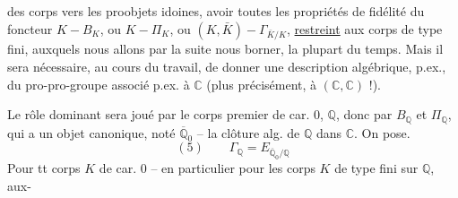 des corps vers les proobjets idoines,  avoir toutes les propriétés de fidélité du foncteur $K-B_K$, ou $K-\Pi_K$, ou $(K,\bar K)-\Gamma_{\bar K/K}$, \uline{restreint} aux corps  de type fini, auxquels nous allons par la suite nous borner, la plupart du temps. Mais il sera nécessaire, au cours du travail, de donner une description  algébrique, p.ex., du pro-pro-groupe  associé p.ex. à $\mathbb C$ (plus précisément, à $(\mathbb C,\mathbb C)$ !).

Le rôle dominant sera joué par le corps premier de car. $0$, $\mathbb Q$, donc par $B_{\mathbb Q}$ et $\Pi_{\mathbb Q}$, qui a un objet canonique, noté $\overline{\mathbb Q}_0$ -- la clôture alg. de $\mathbb Q$ dans $\mathbb C$. On pose.
\[
(5)\qquad \Gamma_{\mathbb Q}=E_{\overline{\mathbb Q}_0/\mathbb Q}
\]
Pour tt corps $K$ de car. $0$ -- en particulier pour les corps $K$ de type fini sur $\mathbb Q$, aux-
